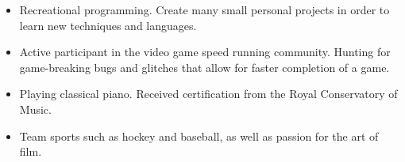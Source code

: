 \documentclass[10pt,letterpaper]{article}
\begin{document}
\begin{itemize}
\parskip=0.1em
\item Recreational programming.  Create many small personal projects in order to learn new techniques and languages.
\item Active participant in the video game speed running community.  Hunting for game-breaking bugs and glitches that allow for faster completion of a game.
\item Playing classical piano.  Received certification from the Royal Conservatory of Music.
\item Team sports such as hockey and baseball, as well as passion for the art of film.
\end{itemize}
\end{document}
